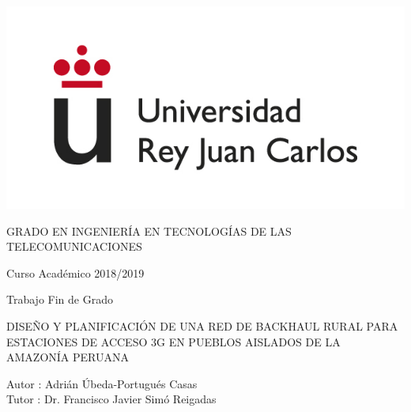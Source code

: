 \documentclass[a4paper, 12pt]{report}
\begin{document}
	\pagestyle{empty}
	\begin{titlepage}
		\centering
		\includegraphics[scale=0.5]{img/logo_urjc.jpg}
		\vspace{3cm}
		
		\Large
		GRADO EN INGENIERÍA EN TECNOLOGÍAS DE LAS TELECOMUNICACIONES
		
		\vspace{0.4cm}
		
		\large
		Curso Académico 2018/2019
		
		\vspace{0.8cm}
		
		Trabajo Fin de Grado
		
		\vspace{2.5cm}		
		\LARGE		
		DISEÑO Y PLANIFICACIÓN DE UNA RED DE
		BACKHAUL RURAL PARA ESTACIONES DE
		ACCESO 3G EN PUEBLOS AISLADOS DE LA
		AMAZONÍA PERUANA
		
		\vspace{2.5 cm}
		
		\large
		Autor : Adrián Úbeda-Portugués Casas \\
		Tutor : Dr. Francisco Javier Simó Reigadas
		\afterpage{\null\newpage}
		\pagestyle{empty}
	\end{titlepage}
	
	
	
	
	
	\thispagestyle{empty}
	\tableofcontents
	\afterpage{\null\newpage}
	\pagestyle{empty}
	\thispagestyle{empty}
	\setcounter{page}{1}
	\pagestyle{plain}
	
	
	
	
	
	
	
	
	
	
	
	
\end{document}
